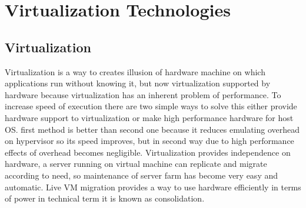 \documentclass[seminar,twoside]{iitbreport}
\begin{document}
\section{Virtualization Technologies}
\subsection{Virtualization}
Virtualization is a way to creates illusion of hardware machine on which applications run without knowing it, 
but now virtualization supported by hardware 
because virtualization has an inherent problem of performance. To increase speed
of execution there are two simple ways to solve this either provide hardware support to
virtualization or make high performance hardware for host OS. first method is better than
second one because it reduces emulating overhead on hypervisor so its speed improves,
but in second way due to high performance effects of overhead becomes negligible. 
Virtualization provides independence on hardware, a server running on virtual machine can
replicate and migrate according to need, so maintenance of server farm has become very
easy and automatic. Live VM migration provides a way to use hardware efficiently in
terms of power in technical term it is known as consolidation.
\end{document}
